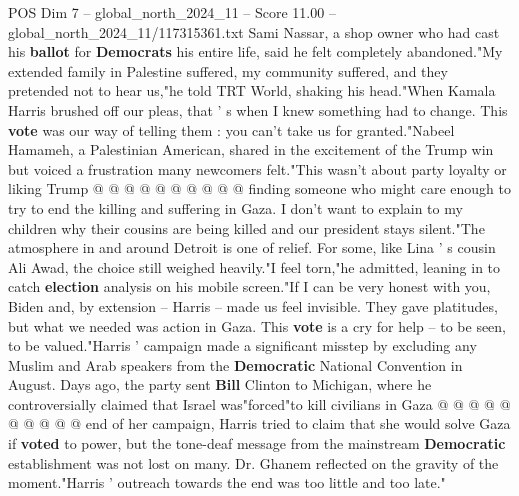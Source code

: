 \begin{textsample}{POS Dim 7 – global\_north\_2024\_11 – Score 11.00 – global\_north\_2024\_11/117315361.txt}
Sami Nassar, a shop owner who had cast his \textbf{ballot} for \textbf{Democrats} his entire life, said he felt completely abandoned."My extended family in Palestine suffered, my community suffered, and they pretended not to hear us,"he told TRT World, shaking his head."When Kamala Harris brushed off our pleas, that ' s when I knew something had to change.
This \textbf{vote} was our way of telling them : you can't take us for granted."Nabeel Hamameh, a Palestinian American, shared in the excitement of the Trump win but voiced a frustration many newcomers felt."This wasn't about party loyalty or liking Trump @ @ @ @ @ @ @ @ @ @ finding someone who might care enough to try to end the killing and suffering in Gaza.
I don't want to explain to my children why their cousins are being killed and our president stays silent."The atmosphere in and around Detroit is one of relief.
For some, like Lina ' s cousin Ali Awad, the choice still weighed heavily."I feel torn,"he admitted, leaning in to catch \textbf{election} analysis on his mobile screen."If I can be very honest with you, Biden and, by extension -- Harris -- made us feel invisible.
They gave platitudes, but what we needed was action in Gaza.
This \textbf{vote} is a cry for help -- to be seen, to be valued."Harris ' campaign made a significant misstep by excluding any Muslim and Arab speakers from the \textbf{Democratic} National Convention in August.
Days ago, the party sent \textbf{Bill} Clinton to Michigan, where he controversially claimed that Israel was"forced"to kill civilians in Gaza @ @ @ @ @ @ @ @ @ @ end of her campaign, Harris tried to claim that she would solve Gaza if \textbf{voted} to power, but the tone-deaf message from the mainstream \textbf{Democratic} establishment was not lost on many.
Dr.
Ghanem reflected on the gravity of the moment."Harris ' outreach towards the end was too little and too late."

\end{textsample}
